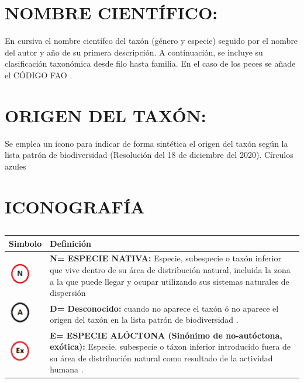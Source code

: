 \documentclass{article}
\begin{document}
\section*{\normalsize{NOMBRE CIENTÍFICO:}}
En cursiva el nombre científco del taxón (género y especie) seguido por  el nombre del autor y año \cite{3,4} de su primera descripción. A continuación, se incluye su clasificación taxonómica desde filo hasta familia. En el caso de los peces se añade  el CÓDIGO FAO \cite{5}. 

\section*{\normalsize{ORIGEN DEL TAXÓN:}}
Se emplea un icono para indicar de forma sintética el origen del taxón según la lista patrón de biodiversidad (Resolución del 18 de diciembre del 2020). 
Círculos azules

\section*{\normalsize{ICONOGRAFÍA}}

\begin{table}[H]
\begin{center}
\begin{tabular}{ >{\centering\arraybackslash}m{2cm} >{\arraybackslash}m{12cm}}
\hline
\rowcolor{green!70!yellow!40}
Simbolo& Definición\\
\hline
\centering\includegraphics[width=1cm, height=1cm]{./images/N.png} & \textbf{N= ESPECIE NATIVA:} Especie, subespecie o taxón inferior que vive dentro de su área de distribución natural, incluida la zona a la que puede llegar y ocupar utilizando sus sistemas naturales de   dispersión \cite{6}\\
\centering\includegraphics[width=1cm, height=1cm]{./images/a.png} & \textbf{D= Desconocido:} cuando no aparece el taxón ó no aparece  el origen del taxón en la lista patrón de biodiversidad \cite{7}.\\
\centering\includegraphics[width=1cm, height=1cm]{./images/EX.png} &\textbf{E= ESPECIE ALÓCTONA (Sinónimo de no-autóctona, exótica):} Especie, subespecie o táxon inferior introducido fuera de su área de distribución natural como resultado de la actividad humana \cite{8, 9}.\\
\hline
\end{tabular}
\end{center}
\caption{}
\label{table3}
\end{table}
\end{document}
